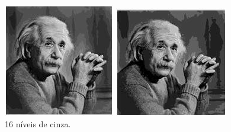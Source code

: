 \documentclass[a4paper, 12pt]{article}
\begin{document}
\\
\begin{figure}[!htb]
	\centering
	  	\includegraphics[width=\linewidth]{images/16.jpg}
	  	\caption{16 níveis de cinza.}
	\endminipage\hspace{1cm}
	 	\includegraphics[width=\linewidth]{images/8.jpg}

\end{figure}
\end{document}
